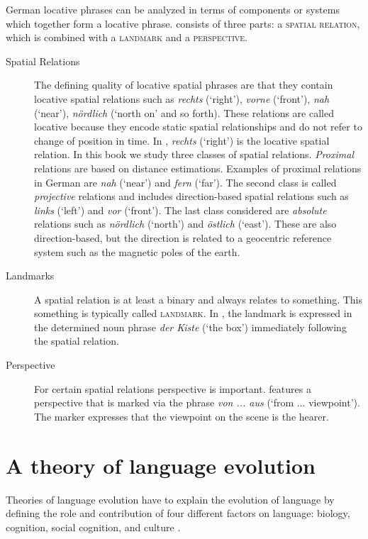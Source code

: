 German locative phrases can be analyzed in terms of components 
or systems which together form a locative phrase.  consists of three parts: 
a \textsc{spatial relation}, which is combined with a \textsc{landmark} and 
a \textsc{perspective}.

\begin{description}
\item[Spatial Relations] The defining quality of locative spatial phrases
are that they contain locative spatial relations such as 
\textit{rechts} (`right'), \textit{vorne} (`front'), \textit{nah} (`near'), 
\textit{n\"ordlich} (`north on' and so forth).
These relations are called locative because they encode
static spatial relationships and do not refer to change of position in time. 
In , \textit{rechts} (`right') is the locative spatial relation.
In this book we study three classes of spatial relations. 
\emph{Proximal} relations are based on distance estimations. 
Examples of proximal relations in German are \textit{nah} (`near') and \textit{fern} (`far').
The second class is called \emph{projective}
relations and includes direction-based spatial relations such as \textit{links} (`left') and \textit{vor} (`front').
The last class considered are \emph{absolute} relations such as \textit{n\"ordlich}
(`north') and \textit{\"ostlich} (`east'). These are also direction-based, but the direction
is related to a geocentric reference system such as the magnetic poles of the
earth.
\item[Landmarks] A spatial relation is at least a binary and always
relates to something. This something is typically called \textsc{landmark}.
In , the landmark 
is expressed in the determined noun phrase 
\textit{der Kiste} (`the box') immediately following the spatial relation.
\item[Perspective] For certain spatial relations perspective is important.
 features a 
perspective that is marked via the phrase \textit{von ... aus} (`from ... viewpoint').
The marker expresses that the viewpoint on the scene is the hearer. 
\end{description}

\section{A theory of language evolution}
\label{s:intro-evolutionary-linguistics}
Theories of language evolution have to explain the evolution of language
by defining the role and contribution of four different factors on language:
biology, cognition, social cognition, and culture 
\citep{steels2009cognition,steels2011self-organization}. 

